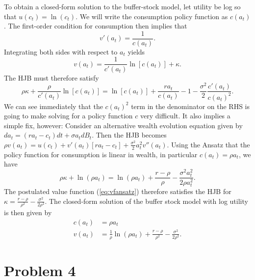 \documentclass[11pt]{extarticle}
\theoremstyle{plain}
\theoremstyle{definition}
\begin{document}
To obtain a closed-form solution to the buffer-stock model, let utility be log so that $u(c_t) = \ln(c_t)$. We will write the consumption policy function as $c(a_t)$. The first-order condition for consumption then implies that 
\begin{equation}
	v'(a_t) = \frac{1}{c(a_t)}.
\end{equation}
Integrating both sides with respect to $a_t$ yields
\begin{equation}\label{eq:vfansatz}
	v(a_t) = \frac{1}{c'(a_t)} \ln[c(a_t)] + \kappa.
\end{equation}
The HJB must therefore satisfy 
\begin{equation*}
	\rho \kappa + \frac{\rho}{c'(a_t)} \ln[c(a_t)] = \ln[c(a_t)] + \frac{r a_t}{c(a_t)} - 1 - \frac{\sigma^2}{2} \frac{c'(a_t)}{c(a_t)^2}.
\end{equation*}
We can see immediately that the $c(a_t)^2$ term in the denominator on the RHS is going to make solving for a policy function $c$ very difficult. It also implies a simple fix, however: Consider an alternative wealth evolution equation given by $da_t = (r a_t - c_t)dt + \sigma a_t dB_t$. Then the HJB becomes $\rho v(a_t) = u(c_t) + v'(a_t)[ra_t -c_t] + \frac{\sigma^2}{2} a_t^2 v''(a_t)$. Using the Ansatz that the policy function for consumption is linear in wealth, in particular $c(a_t) = \rho a_t$, we have 
\begin{equation*}
	\rho \kappa + \ln(\rho a_t) = \ln(\rho a_t) + \frac{r-\rho}{\rho} - \frac{\sigma^2a_t^2}{2 \rho a_t^2}.
\end{equation*}
The postulated value function (\ref{eq:vfansatz}) therefore satisfies the HJB for $\kappa = \frac{r - \rho}{\rho^2} - \frac{\sigma^2}{2\rho^2}$. The closed-form solution of the buffer stock model with log utility is then given by 
\begin{align}
	c(a_t) &= \rho a_t \\
	v(a_t) &= \frac{1}{\rho} \ln(\rho a_t) + \frac{r - \rho}{\rho^2} - \frac{\sigma^2}{2\rho^2}.
\end{align} 





\vspace{10mm}
\section*{Problem 4}
\end{document}
